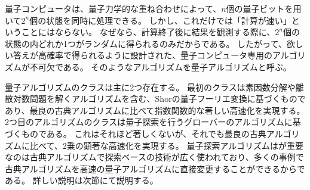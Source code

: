 \begin{comment}
    量子アルゴリズムについての記述
    24
\end{comment}

量子コンピュータは、量子力学的な重ね合わせによって、$n$個の量子ビットを用いて$2^n$個の状態を同時に処理できる。
しかし、これだけでは「計算が速い」ということにはならない。
なぜなら、計算終了後に結果を観測する際に、$2^n$個の状態の内どれか1つがランダムに得られるのみだからである。
したがって、欲しい答えが高確率で得られるように設計された、量子コンピュータ専用のアルゴリズムが不可欠である。
そのようなアルゴリズムを量子アルゴリズムと呼ぶ\cite{QuantumDojo}。



量子アルゴリズムのクラスは主に2つ存在する。
最初のクラスは素因数分解や離散対数問題を解くアルゴリズムを含む、Shorの量子フーリエ変換に基づくものであり、最良の古典アルゴリズムに比べて指数関数的な著しい高速化を実現する。
2つ目のアルゴリズムのクラスは量子探索を行うグローバーのアルゴリズムに基づくものである。
これはそれほど著しくないが、それでも最良の古典アルゴリズムに比べて、2乗の顕著な高速化を実現する。
量子探索アルゴリズムはが重要なのは古典アルゴリズムで探索ベースの技術が広く使われており、多くの事例で古典アルゴリズムを高速の量子アルゴリズムに直接変更することができるからである\cite{QuantumComputation&Infomation2}。
詳しい説明は次節にて説明する。